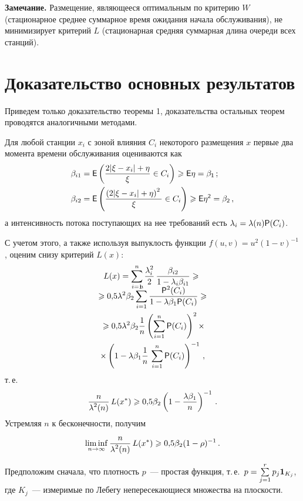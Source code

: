 \begin{multicols}{2}
\bigskip
{\bf{Замечание.}} Размещение, являющееся оптимальным по критерию $W$ (стационарное
среднее суммарное время ожидания начала обслуживания), не минимизирует критерий $L$
(стационарная средняя суммарная длина очереди всех станций).

\section{Доказательство основных результатов}

Приведем только доказательство теоремы 1, доказательства остальных теорем проводятся
аналогичными методами.


Для любой станции $x_i$ с зоной влияния $C_i$ некоторого
размещения $x$ первые два момента времени обслуживания оцениваются
как
\begin{align*}
\beta_{i1} & ={\sf E} \left ( \displaystyle\frac{\displaystyle 2\vert \xi-x_i\vert +\eta\mathstrut}{\displaystyle \xi\mathstrut}\in C_i\right ) \geqslant
\sf E\eta =\beta_1\,;\\
\beta_{i2}& = {\sf E} \left ( \displaystyle\frac{\displaystyle \left (2\vert \xi-x_i\vert +\eta\right )^2\mathstrut}{\displaystyle \xi\mathstrut}\in
C_i\right )\geqslant \sf E\eta^2=\beta_2\,,
\end{align*}
 а интенсивность потока
поступающих на нее требований есть $\lambda_i=\lambda(n) {\sf P} (C_i)$.

С учетом этого, а также используя выпуклость функции
$f(u,v)=u^2(1-v)^{-1}$, оценим снизу критерий $L(x)$:
\begin{multline*}
L(x) =\sum\limits_{i=1}^{n}\displaystyle\frac{\displaystyle \lambda_i^2\mathstrut}{\displaystyle 2\mathstrut}\,\displaystyle\frac{\displaystyle \beta_{i2}\mathstrut}{\displaystyle 1-\lambda_i \beta_{i1}\mathstrut}\geqslant {}\\[-12pt]
\end{multline*}
\begin{multline*}
{}\geqslant 0{,}5\lambda^2\beta_2\sum\limits_{i=1}^{n}
\displaystyle\frac{\displaystyle {\sf P}^2(C_i)\mathstrut}{\displaystyle 1-\lambda \beta_1 {\sf P}(C_i)\mathstrut}\geqslant{}\\
{}\geqslant 0{,}5\lambda^2\beta_2
\displaystyle\frac{\displaystyle 1\mathstrut}{\displaystyle n\mathstrut}\left(\sum\limits_{i=1}^{n}{\sf P}(C_i)\right)^2\times \\
\times
 \left(1-\lambda
\beta_1 \displaystyle\frac{\displaystyle 1\mathstrut}{\displaystyle n\mathstrut}\,\sum\limits_{i=1}^{n}{\sf P}(C_i)\right)^{-1}\,,
\end{multline*}
 т.\,е.
$$
\displaystyle\frac{\displaystyle n\mathstrut}{\displaystyle \lambda^2(n)\mathstrut}\,L(x^*)\geqslant
0{,}5\beta_2\left ( 1-\displaystyle\frac{\displaystyle \lambda \beta_1\mathstrut}{\displaystyle n\mathstrut}\right )^{-1}\,.
$$
Устремляя $n$ к бесконечности, получим
$$
\liminf\limits_{n \to \infty}\displaystyle\frac{\displaystyle n\mathstrut}{\displaystyle \lambda^2(n)\mathstrut}\,L(x^*)\geqslant
0{,}5\beta_2(1-\rho)^{-1}\,.
$$

Предположим сначала, что плотность $p$~--- прос\-тая функция, т.\,е.\
$p=\sum\limits_{j=1}^{r}p_j \textbf{1}_{K_j}$,
где $K_j$~--- измеримые по
Лебегу непересекающиеся множества на плоскости.


\end{multicols}
